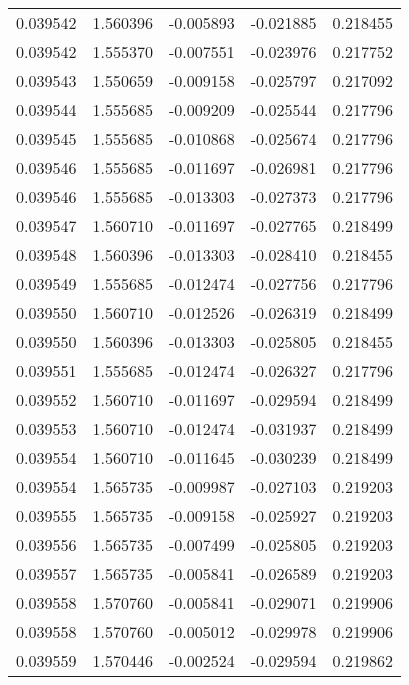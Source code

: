 \begin{tabular}{lrrrr}
0.039542    &  1.560396 & -0.005893 & -0.021885 &             0.218455 \\
0.039542    &  1.555370 & -0.007551 & -0.023976 &             0.217752 \\
0.039543    &  1.550659 & -0.009158 & -0.025797 &             0.217092 \\
0.039544    &  1.555685 & -0.009209 & -0.025544 &             0.217796 \\
0.039545    &  1.555685 & -0.010868 & -0.025674 &             0.217796 \\
0.039546    &  1.555685 & -0.011697 & -0.026981 &             0.217796 \\
0.039546    &  1.555685 & -0.013303 & -0.027373 &             0.217796 \\
0.039547    &  1.560710 & -0.011697 & -0.027765 &             0.218499 \\
0.039548    &  1.560396 & -0.013303 & -0.028410 &             0.218455 \\
0.039549    &  1.555685 & -0.012474 & -0.027756 &             0.217796 \\
0.039550    &  1.560710 & -0.012526 & -0.026319 &             0.218499 \\
0.039550    &  1.560396 & -0.013303 & -0.025805 &             0.218455 \\
0.039551    &  1.555685 & -0.012474 & -0.026327 &             0.217796 \\
0.039552    &  1.560710 & -0.011697 & -0.029594 &             0.218499 \\
0.039553    &  1.560710 & -0.012474 & -0.031937 &             0.218499 \\
0.039554    &  1.560710 & -0.011645 & -0.030239 &             0.218499 \\
0.039554    &  1.565735 & -0.009987 & -0.027103 &             0.219203 \\
0.039555    &  1.565735 & -0.009158 & -0.025927 &             0.219203 \\
0.039556    &  1.565735 & -0.007499 & -0.025805 &             0.219203 \\
0.039557    &  1.565735 & -0.005841 & -0.026589 &             0.219203 \\
0.039558    &  1.570760 & -0.005841 & -0.029071 &             0.219906 \\
0.039558    &  1.570760 & -0.005012 & -0.029978 &             0.219906 \\
0.039559    &  1.570446 & -0.002524 & -0.029594 &             0.219862 \\

\end{tabular}
